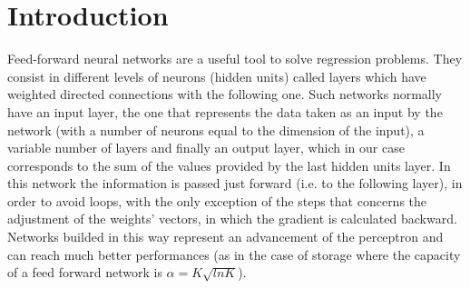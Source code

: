 \section{Introduction}
\label{sec:introduction}

Feed-forward neural networks are a useful tool to solve regression problems.
They consist in different levels of neurons (hidden units) called layers which have weighted directed connections with the following one.
Such networks normally have an input layer, the one that represents the data taken as an input by the network (with a number of neurons equal to the dimension of the input), a variable number of layers and finally an output layer, which in our case corresponds to the sum of the values provided by the last hidden units layer.
In this network the information is passed just forward (i.e. to the following layer), in order to avoid loops, with the only exception of the steps that concerns the adjustment of the weights' vectors, in which the gradient is calculated backward.
Networks builded in this way represent an advancement of the perceptron and can reach much better performances (as in the case of storage where the capacity of a feed forward network is $\alpha = K \sqrt{ln K}$).

\cite{chauvin1995backpropagation}
